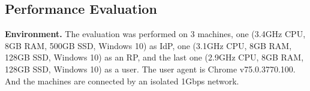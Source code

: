 \subsection{Performance Evaluation}
\label{sec:evaluation}
\noindent\textbf{Environment.} The evaluation was performed on 3 machines, one (3.4GHz CPU, 8GB RAM, 500GB SSD, Windows 10) as IdP, one (3.1GHz CPU, 8GB RAM, 128GB SSD, Windows 10) as an RP, and the last one (2.9GHz CPU, 8GB RAM, 128GB SSD, Windows 10) as a user. The user agent is Chrome v75.0.3770.100. And the machines are connected by an isolated 1Gbps network.



